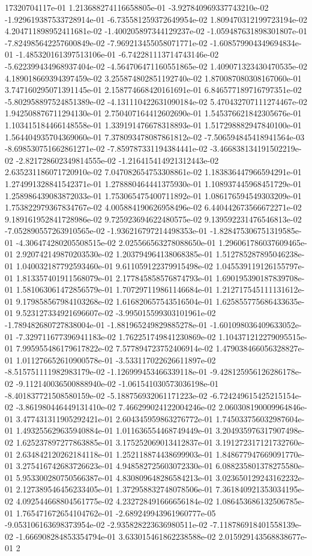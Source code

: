 17320704117e-01	1.213688274116658805e-01	-3.927840969337743210e-02	-1.929619387533728914e-01	-6.735581259372649954e-02	1.809470312199723194e-02	4.204711898952411681e-02	-1.400205897344129237e-02	-1.059487631898301807e-01	-7.824985642257600849e-02	-7.969213455058071771e-02	-1.608579904349694834e-01	-1.485320161397513106e-01	-6.742281113714743146e-02	-5.622399434968937404e-02	-4.564706471160551865e-02	1.409071323430470535e-02	4.189018669394397459e-02	3.255874802851192740e-02	1.870087080308167060e-01	3.747160295071391145e-01	2.158774668420161691e-01	6.846577189716797351e-02	-5.802958897524851389e-02	-4.131110422631090184e-02	5.470432707111274467e-02	1.942508876711294130e-01	2.750407164412602690e-01	1.545376621842305676e-01	1.103415184466148558e-01	1.339191476678318893e-01	1.517298882947840100e-01	1.564404935704369060e-01	7.378093478087861812e-02	-7.506594845418941564e-03	-8.698530751662861271e-02	-7.859787331194384441e-02	-3.466838134191502219e-02	-2.821728602349814555e-02	-1.216415414921312443e-02	2.635231186071720910e-02	7.047082654753308861e-02	1.183836447966594291e-01	1.274991328841542371e-01	1.278880464441375930e-01	1.108937445968451729e-01	1.258986439083872033e-01	1.753065475400711892e-01	1.086176594549303209e-01	1.753822979367834767e-02	4.005884190626958496e-02	6.440442673566672271e-02	9.189161952841728986e-02	9.725923694622480575e-02	9.139592231476546813e-02	-7.052890557263910565e-02	-1.936216797214498353e-01	-1.828475306751319585e-01	-4.306474280205508515e-02	2.025566563278088650e-01	1.296061786037609465e-01	2.920742149870203530e-02	1.203794964138068385e-01	1.512785287895046238e-01	1.040032187792593460e-01	9.611059122379915498e-02	1.045539119126155797e-01	1.813357401911568079e-01	2.177845858576874793e-01	1.690195390187839708e-01	1.581063061472856579e-01	1.707297119861146684e-01	1.212717545111131612e-01	9.179858567984103268e-02	1.616820657543516504e-01	1.625855775686433635e-01	9.523127334921696607e-02	-3.995015599303101961e-02	-1.789482680727838004e-01	-1.881965249829885278e-01	-1.601098036409633052e-01	-7.329711677396941183e-02	1.762251749841230869e-02	1.104371212279095515e-01	7.995955486179617822e-02	7.577894723752406914e-02	1.479038466056328827e-01	1.011276652610900578e-01	-3.533117022626611897e-02	-8.515751111982983179e-02	-1.126999453466339118e-01	-9.428125956126286178e-02	-9.112140036500888940e-02	-1.061541030573036198e-01	-8.401837721508580159e-02	-5.188756932061171223e-02	-6.724249615425215154e-02	-3.861980446449131410e-02	7.466299024122004246e-02	2.060308190009964846e-01	3.477431311905292421e-01	2.604345959863276772e-01	1.745033756032987604e-01	1.493255629635940884e-01	1.011636554468749449e-01	3.204935976317907498e-02	1.625237897277863885e-01	3.175252069013412837e-01	3.191272317121732760e-01	2.634842120262184118e-01	1.252118874438699903e-01	1.848677947669091770e-01	3.275416742683726623e-01	4.948582725603072330e-01	6.088235801378275580e-01	5.953300280750566387e-01	4.830809648286584213e-01	3.023650129243162232e-01	2.127389546456233405e-01	1.372958832748078506e-01	7.361840921353034195e-02	4.092544668804561775e-02	4.232728491666656184e-02	1.086453686132506785e-01	1.765471672654104762e-01	-2.689249943961960777e-05	-9.053106163698373954e-02	-2.935828223636980511e-02	-7.118786918401558139e-02	-1.666908284853354794e-01	3.633015461862238588e-02	2.015929143568838677e-01	2